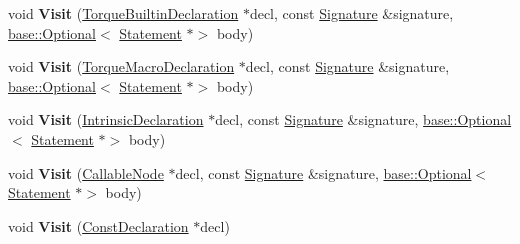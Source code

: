 \begin{DoxyCompactItemize}
void {\bfseries Visit} (\mbox{\hyperlink{structv8_1_1internal_1_1torque_1_1TorqueBuiltinDeclaration}{Torque\+Builtin\+Declaration}} $\ast$decl, const \mbox{\hyperlink{structv8_1_1internal_1_1torque_1_1Signature}{Signature}} \&signature, \mbox{\hyperlink{classv8_1_1base_1_1Optional}{base\+::\+Optional}}$<$ \mbox{\hyperlink{structv8_1_1internal_1_1torque_1_1Statement}{Statement}} $\ast$$>$ body)
\item 
\mbox{\label{classv8_1_1internal_1_1torque_1_1DeclarationVisitor_a39f9a387d00f4411f0283bdbd0ad031f}} 
void {\bfseries Visit} (\mbox{\hyperlink{structv8_1_1internal_1_1torque_1_1TorqueMacroDeclaration}{Torque\+Macro\+Declaration}} $\ast$decl, const \mbox{\hyperlink{structv8_1_1internal_1_1torque_1_1Signature}{Signature}} \&signature, \mbox{\hyperlink{classv8_1_1base_1_1Optional}{base\+::\+Optional}}$<$ \mbox{\hyperlink{structv8_1_1internal_1_1torque_1_1Statement}{Statement}} $\ast$$>$ body)
\item 
\mbox{\label{classv8_1_1internal_1_1torque_1_1DeclarationVisitor_aecb725a27e226651b2b4826deda1820d}} 
void {\bfseries Visit} (\mbox{\hyperlink{structv8_1_1internal_1_1torque_1_1IntrinsicDeclaration}{Intrinsic\+Declaration}} $\ast$decl, const \mbox{\hyperlink{structv8_1_1internal_1_1torque_1_1Signature}{Signature}} \&signature, \mbox{\hyperlink{classv8_1_1base_1_1Optional}{base\+::\+Optional}}$<$ \mbox{\hyperlink{structv8_1_1internal_1_1torque_1_1Statement}{Statement}} $\ast$$>$ body)
\item 
\mbox{\label{classv8_1_1internal_1_1torque_1_1DeclarationVisitor_a2967413a39e7de3f673009d930c7a8a1}} 
void {\bfseries Visit} (\mbox{\hyperlink{structv8_1_1internal_1_1torque_1_1CallableNode}{Callable\+Node}} $\ast$decl, const \mbox{\hyperlink{structv8_1_1internal_1_1torque_1_1Signature}{Signature}} \&signature, \mbox{\hyperlink{classv8_1_1base_1_1Optional}{base\+::\+Optional}}$<$ \mbox{\hyperlink{structv8_1_1internal_1_1torque_1_1Statement}{Statement}} $\ast$$>$ body)
\item 
\mbox{\label{classv8_1_1internal_1_1torque_1_1DeclarationVisitor_ab3a67a14d684dd460c44f18b446653a2}} 
void {\bfseries Visit} (\mbox{\hyperlink{structv8_1_1internal_1_1torque_1_1ConstDeclaration}{Const\+Declaration}} $\ast$decl)

\end{DoxyCompactItemize}
